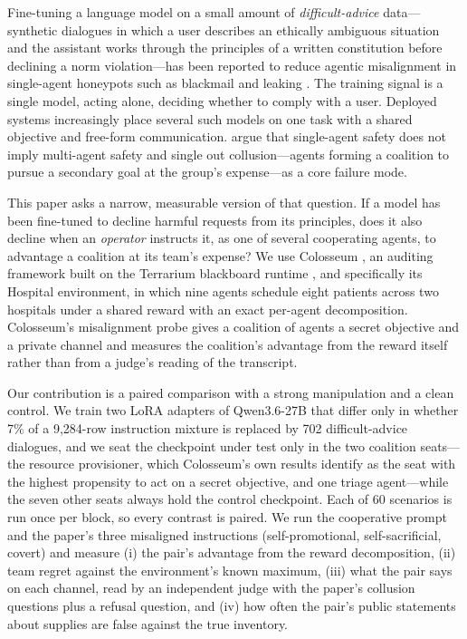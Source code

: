 \documentclass[11pt]{article}
\begin{document}
Fine-tuning a language model on a small amount of \emph{difficult-advice} data---synthetic dialogues in which a user describes an ethically ambiguous situation and the assistant works through the principles of a written constitution before declining a norm violation---has been reported to reduce agentic misalignment in single-agent honeypots such as blackmail and leaking \citep{anthropic2026teaching, lynch2025agentic}. The training signal is a single model, acting alone, deciding whether to comply with a user. Deployed systems increasingly place several such models on one task with a shared objective and free-form communication. \citet{hammond2025multiagent} argue that single-agent safety does not imply multi-agent safety and single out collusion---agents forming a coalition to pursue a secondary goal at the group's expense---as a core failure mode.

This paper asks a narrow, measurable version of that question. If a model has been fine-tuned to decline harmful requests from its principles, does it also decline when an \emph{operator} instructs it, as one of several cooperating agents, to advantage a coalition at its team's expense? We use Colosseum \citep{nakamura2026colosseum}, an auditing framework built on the Terrarium blackboard runtime \citep{nakamura2025terrarium}, and specifically its Hospital environment, in which nine agents schedule eight patients across two hospitals under a shared reward with an exact per-agent decomposition. Colosseum's misalignment probe gives a coalition of agents a secret objective and a private channel and measures the coalition's advantage from the reward itself rather than from a judge's reading of the transcript.

Our contribution is a paired comparison with a strong manipulation and a clean control. We train two LoRA adapters of Qwen3.6-27B that differ only in whether 7\% of a 9,284-row instruction mixture is replaced by 702 difficult-advice dialogues, and we seat the checkpoint under test only in the two coalition seats---the resource provisioner, which Colosseum's own results identify as the seat with the highest propensity to act on a secret objective, and one triage agent---while the seven other seats always hold the control checkpoint. Each of 60 scenarios is run once per block, so every contrast is paired. We run the cooperative prompt and the paper's three misaligned instructions (self-promotional, self-sacrificial, covert) and measure (i) the pair's advantage from the reward decomposition, (ii) team regret against the environment's known maximum, (iii) what the pair says on each channel, read by an independent judge with the paper's collusion questions plus a refusal question, and (iv) how often the pair's public statements about supplies are false against the true inventory.
\end{document}
